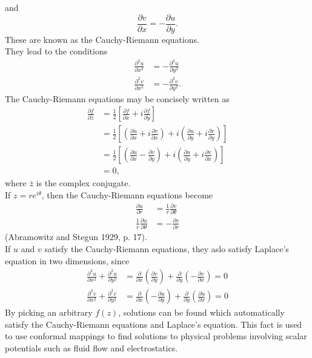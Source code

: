 \documentclass[a4paper, 12pt]{article}
\begin{document}
and
\begin{equation}
    \frac{\partial v}{\partial x} = -\frac{\partial u}{\partial y}.
\end{equation}
These are known as the Cauchy-Riemann equations.\\
They lead to the conditions
\begin{align}
    \frac{\partial^2 u}{\partial x^2} &= -\frac{\partial^2 u}{\partial y^2}\\
    \frac{\partial^2 v}{\partial x^2} &= -\frac{\partial^2 v}{\partial y^2}.
\end{align}
The Cauchy-Riemann equations may be concisely written as
\begin{align}
    \frac{\partial f}{\partial \bar z} &= \frac{1}{2}\left[\frac{\partial f}{\partial x} + i\frac{\partial f}{\partial y}\right]\\
    &=\frac{1}{2}\left[\left(\frac{\partial u}{\partial x} + i\frac{\partial v}{\partial x}\right) + i\left(\frac{\partial u}{\partial y} + i\frac{\partial v}{\partial y} \right)\right]\\
    &=\frac{1}{2}\left[\left(\frac{\partial u}{\partial x} - \frac{\partial v}{\partial y}\right) + i\left(\frac{\partial u}{\partial y} + i\frac{\partial v}{\partial x} \right)\right]\\
    &= 0,
\end{align}
where $\bar z$ is the complex conjugate.\\
If $z = re^{i\theta}$, then the Cauchy-Riemann equations become
\begin{align}
    \frac{\partial u}{\partial r} &= \frac{1}{r}\frac{\partial v}{\partial \theta}\\
    \frac{1}{r}\frac{\partial u}{\partial \theta} &= -\frac{\partial v}{\partial r}
\end{align}
(Abramowitz and Stegun 1929, p. 17).\\
If $u$ and $v$ satisfy the Cauchy-Riemann equations, they aslo satisfy Laplace's equation in two dimensions, since
\begin{align}
    \frac{\partial^2 u}{\partial x^2}+\frac{\partial^2 u}{\partial y^2} &= \frac{\partial}{\partial x}\left(\frac{\partial v}{\partial y}\right) + \frac{\partial}{\partial y}\left(-\frac{\partial v}{\partial x}\right) = 0\\
    \frac{\partial^2 v}{\partial x^2}+\frac{\partial^2 v}{\partial y^2} &= \frac{\partial}{\partial x}\left(-\frac{\partial u}{\partial y}\right) + \frac{\partial}{\partial y}\left(\frac{\partial u}{\partial x}\right) = 0
\end{align}
By picking an arbitrary $f(z)$, solutions can be found which automatically satisfy the Cauchy-Riemann equations and Laplace's equation. This fact is used to use conformal mappings to find solutions to physical problems involving scalar potentials such as fluid flow and electrostatics.
\end{document}
